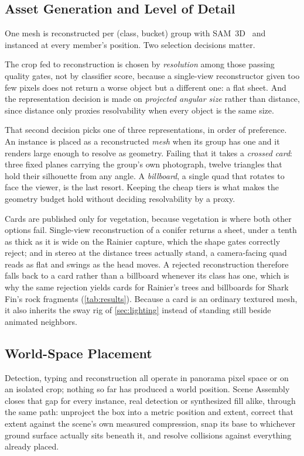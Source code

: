 \subsection{Asset Generation and Level of Detail}

One mesh is reconstructed per (class, bucket) group with
SAM~3D~\cite{sam3dteam2025sam3d3dfyimages} and instanced at every member's
position. Two selection decisions matter.

The crop fed to reconstruction is chosen by \emph{resolution} among those passing
quality gates, not by classifier score, because a single-view reconstructor given too few pixels does not return a worse
object but a different one: a flat sheet. And the representation decision is made
on \emph{projected angular size} rather than distance, since distance only proxies
resolvability when every object is the same size.

That second decision picks one of three representations, in order of preference.
An instance is placed as a reconstructed \emph{mesh} when its group has one and it
renders large enough to resolve as geometry. Failing that it takes a \emph{crossed
card}: three fixed planes carrying the group's own photograph, twelve triangles
that hold their silhouette from any angle. A \emph{billboard}, a single quad that
rotates to face the viewer, is the last resort. Keeping the cheap tiers is what
makes the geometry budget hold without deciding resolvability by a proxy.

Cards are published only for vegetation, because vegetation is where both other
options fail. Single-view reconstruction of a conifer returns a sheet, under a
tenth as thick as it is wide on the Rainier capture, which the shape gates
correctly reject; and in stereo at the distance trees actually stand, a
camera-facing quad reads as flat and swings as the head moves. A rejected
reconstruction therefore falls back to a card rather than a billboard whenever its
class has one, which is why the same rejection yields cards for Rainier's trees and
billboards for Shark Fin's rock fragments (\cref{tab:results}). Because a card is
an ordinary textured mesh, it also inherits the sway rig of \cref{sec:lighting}
instead of standing still beside animated neighbors.

\subsection{World-Space Placement}
\label{sec:placement}

Detection, typing and reconstruction all operate in panorama pixel space or on an
isolated crop; nothing so far has produced a world position. Scene Assembly closes
that gap for every instance, real detection or synthesized fill alike, through the
same path: unproject the box into a metric position and extent, correct that extent
against the scene's own measured compression, snap its base to whichever ground
surface actually sits beneath it, and resolve collisions against everything already
placed.

